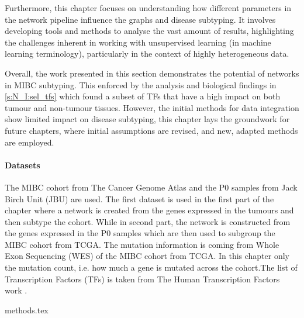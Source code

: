 Furthermore, this chapter focuses on understanding how different parameters in the network pipeline influence the graphs and disease subtyping. It involves developing tools and methods to analyse the vast amount of results, highlighting the challenges inherent in working with unsupervised learning (in machine learning terminology), particularly in the context of highly heterogeneous data.

Overall, the work presented in this section demonstrates the potential of networks in MIBC subtyping. This enforced by the analysis and biological findings in \cref{s:N_I:sel_tfs} which found a subset of TFs that have a high impact on both tumour and non-tumour tissues. However, the initial methods for data integration show limited impact on disease subtyping, this chapter lays the groundwork for future chapters, where initial assumptions are revised, and new, adapted methods are employed.

\paragraph*{Datasets}

The MIBC cohort from The Cancer Genome Atlas \cite{Robertson2017-mg} and the P0 samples from Jack Birch Unit (JBU) are used. The first dataset is used in the first part of the chapter where a network is created from the genes expressed in the tumours and then subtype the cohort. While in second part, the network is constructed from the genes expressed in the P0 samples which are then used to subgroup the MIBC cohort from TCGA. The mutation information is coming from Whole Exon Sequencing (WES) of the MIBC cohort from TCGA. In this chapter only the mutation count, i.e. how much a gene is mutated across the cohort.The list of Transcription Factors (TFs) is taken from The Human Transcription Factors work \citet{Lambert2018-el}.



{methods.tex}
\newpage



